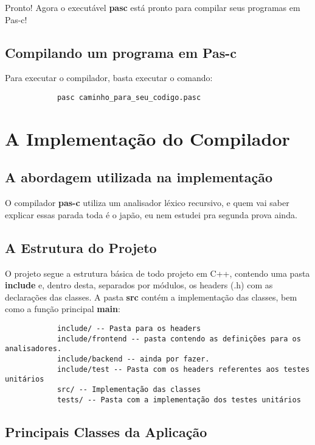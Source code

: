 \documentclass[11pt]{article}
\begin{document}
		Pronto! Agora o executável \textbf{pasc} está pronto para compilar seus programas em Pas-c!
	
	
	\subsection{Compilando um programa em Pas-c}
	
		Para executar o compilador, basta executar o comando:
		
		\begin{verbatim}
			pasc caminho_para_seu_codigo.pasc
		\end{verbatim}
	

\newpage
\section{A Implementação do Compilador}
	
	\subsection{A abordagem utilizada na implementação}
		
		O compilador \textbf{pas-c} utiliza um analisador léxico recursivo, e quem vai saber explicar essas parada toda é o japão, eu nem estudei pra segunda prova ainda. 
		
	\subsection{A Estrutura do Projeto}
		
		O projeto segue a estrutura básica de todo projeto em C++, contendo uma pasta \textbf{include} e, dentro desta, separados por módulos, os headers (.h) com as declarações das classes. A pasta \textbf{src} contém a implementação das classes, bem como a função principal \textbf{main}:
		
		\begin{verbatim}
			include/ -- Pasta para os headers
			include/frontend -- pasta contendo as definições para os analisadores.
			include/backend -- ainda por fazer.
			include/test -- Pasta com os headers referentes aos testes unitários
			src/ -- Implementação das classes
			tests/ -- Pasta com a implementação dos testes unitários 
		\end{verbatim}
		
		
		
	\subsection{Principais Classes da Aplicação}
		
\end{document}
